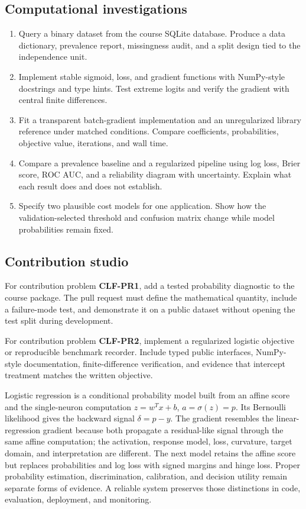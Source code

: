 \subsection*{Computational investigations}
\begin{enumerate}[label=\textbf{P\arabic*.}]
  \item Query a binary dataset from the course SQLite database. Produce a data
  dictionary, prevalence report, missingness audit, and a split design tied to
  the independence unit.
  \item Implement stable sigmoid, loss, and gradient functions with NumPy-style
  docstrings and type hints. Test extreme logits and verify the gradient with
  central finite differences.
  \item Fit a transparent batch-gradient implementation and an unregularized
  library reference under matched conditions. Compare coefficients,
  probabilities, objective value, iterations, and wall time.
  \item Compare a prevalence baseline and a regularized pipeline using log loss,
  Brier score, ROC AUC, and a reliability diagram with uncertainty. Explain what
  each result does and does not establish.
  \item Specify two plausible cost models for one application. Show how the
  validation-selected threshold and confusion matrix change while model
  probabilities remain fixed.
\end{enumerate}

\subsection*{Contribution studio}

For contribution problem \textbf{CLF-PR1}, add a tested probability diagnostic
to the course package. The pull request must define the mathematical quantity,
include a failure-mode test, and demonstrate it on a public dataset without
opening the test split during development.

For contribution problem \textbf{CLF-PR2}, implement a regularized logistic
objective or reproducible benchmark recorder. Include typed public interfaces,
NumPy-style documentation, finite-difference verification, and evidence that
intercept treatment matches the written objective.

\begin{chapterreview}
Logistic regression is a conditional probability model built from an affine
score and the single-neuron computation $z=w^Tx+b$, $a=\sigma(z)=p$. Its
Bernoulli likelihood gives the backward signal $\delta=p-y$. The gradient
resembles the linear-regression gradient because both propagate a residual-like
signal through the same affine computation; the activation, response model,
loss, curvature, target domain, and interpretation are different. The next
model retains the affine score but replaces probabilities and log loss with
signed margins and hinge loss. Proper probability estimation, discrimination,
calibration, and decision utility remain separate forms of evidence. A reliable
system preserves those distinctions in code, evaluation, deployment, and
monitoring.
\end{chapterreview}

